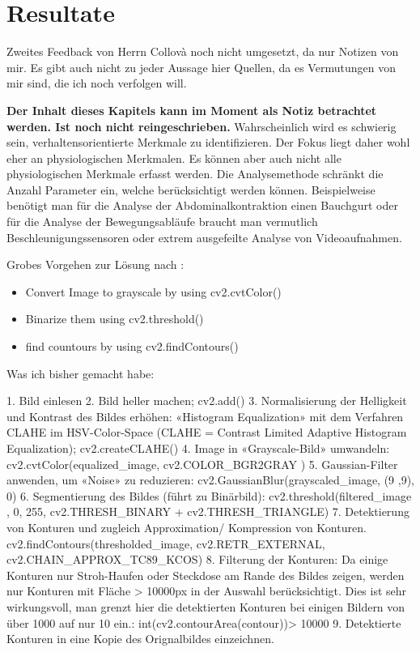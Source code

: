 

\chapter{Resultate}

Zweites Feedback von Herrn Collovà noch nicht umgesetzt, da nur Notizen von mir. Es gibt auch nicht zu jeder Aussage hier Quellen, da es Vermutungen von mir sind, die ich noch verfolgen will. 

\textbf{Der Inhalt dieses Kapitels kann im Moment als Notiz betrachtet werden. Ist noch nicht reingeschrieben.} \newline
Wahrscheinlich wird es schwierig sein, verhaltensorientierte Merkmale zu identifizieren. Der Fokus liegt daher wohl eher an physiologischen Merkmalen. 
Es können aber auch nicht alle physiologischen Merkmale erfasst werden. Die Analysemethode schränkt die Anzahl Parameter ein, welche berücksichtigt werden können. Beispielweise benötigt man für die Analyse der Abdominalkontraktion einen Bauchgurt oder für die Analyse der Bewegungsabläufe braucht man vermutlich Beschleunigungssensoren oder extrem ausgefeilte Analyse von Videoaufnahmen.

Grobes Vorgehen zur Lösung nach \citep[S. 256]{FernandezVillan2019}: 

\begin{itemize}
	\item Convert Image to grayscale by using cv2.cvtColor()
	\item Binarize them using cv2.threshold()
	\item find countours by using cv2.findContours()
\end{itemize}

Was ich bisher gemacht habe: 

1.	Bild einlesen
2.	Bild heller machen; cv2.add()
3.	Normalisierung der Helligkeit und Kontrast des Bildes erhöhen: «Histogram Equalization» mit dem Verfahren CLAHE im HSV-Color-Space (CLAHE = Contrast Limited Adaptive Histogram Equalization); cv2.createCLAHE()
4.	Image in «Grayscale-Bild» umwandeln: cv2.cvtColor(equalized\_image, cv2.COLOR\_BGR2GRAY )
5.	Gaussian-Filter anwenden, um «Noise» zu reduzieren: cv2.GaussianBlur(grayscaled\_image, (9  ,9), 0)
6.	Segmentierung des Bildes  (führt zu Binärbild): cv2.threshold(filtered\_image , 0, 255, cv2.THRESH\_BINARY + cv2.THRESH\_TRIANGLE)
7.	Detektierung von Konturen und zugleich Approximation/ Kompression von Konturen. cv2.findContours(thresholded\_image, cv2.RETR\_EXTERNAL, cv2.CHAIN\_APPROX\_TC89\_KCOS)
8.	Filterung der Konturen: Da einige Konturen nur Stroh-Haufen oder Steckdose am Rande des Bildes zeigen, werden nur Konturen mit Fläche > 10000px in der Auswahl berücksichtigt. Dies ist sehr wirkungsvoll, man grenzt hier die detektierten Konturen bei einigen Bildern von über 1000 auf nur 10 ein.: int(cv2.contourArea(contour))> 10000
9.	Detektierte Konturen in eine Kopie des Orignalbildes einzeichnen.

